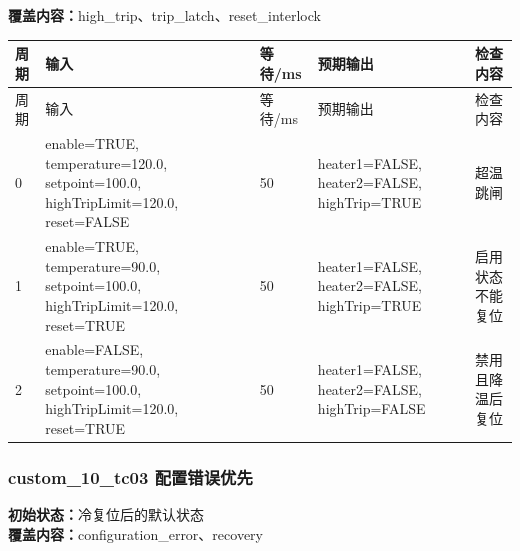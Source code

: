 \textbf{覆盖内容：}high\_trip、trip\_latch、reset\_interlock

\begin{longtable}{L{1.0cm}L{4.7cm}L{1.4cm}L{4.0cm}L{2.1cm}}

\toprule

周期 & 输入 & 等待/ms & 预期输出 & 检查内容\\

\midrule

\endfirsthead

\toprule

周期 & 输入 & 等待/ms & 预期输出 & 检查内容\\

\midrule

\endhead

0 & enable=TRUE, temperature=120.0, setpoint=100.0, highTripLimit=120.0, reset=FALSE & 50 & heater1=FALSE, heater2=FALSE, highTrip=TRUE & 超温跳闸\\

1 & enable=TRUE, temperature=90.0, setpoint=100.0, highTripLimit=120.0, reset=TRUE & 50 & heater1=FALSE, heater2=FALSE, highTrip=TRUE & 启用状态不能复位\\

2 & enable=FALSE, temperature=90.0, setpoint=100.0, highTripLimit=120.0, reset=TRUE & 50 & heater1=FALSE, heater2=FALSE, highTrip=FALSE & 禁用且降温后复位\\

\bottomrule

\end{longtable}

\subsubsection{{\ttfamily custom\_10\_tc03} 配置错误优先}

\noindent\textbf{初始状态：}冷复位后的默认状态\\

\textbf{覆盖内容：}configuration\_error、recovery

